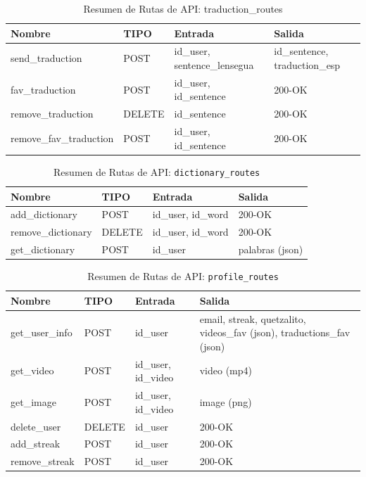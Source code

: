 \begin{table}[H]
\centering
\begin{tabularx}{\textwidth}{|l|l|l|X|}
\hline
\textbf{Nombre} & \textbf{TIPO} & \textbf{Entrada} & \textbf{Salida} \\ \hline
send\_traduction & POST & id\_user, sentence\_lensegua & id\_sentence, traduction\_esp \\ \hline
fav\_traduction & POST & id\_user, id\_sentence & 200-OK \\ \hline
remove\_traduction & DELETE & id\_sentence & 200-OK \\ \hline
remove\_fav\_traduction & POST & id\_user, id\_sentence & 200-OK \\ \hline
\end{tabularx}
\caption{Resumen de Rutas de API: traduction\_routes}
\label{tab:traduction_routes}
\end{table}

\begin{table}[H]
\centering
\begin{tabularx}{\textwidth}{|l|l|l|X|}
\hline
\textbf{Nombre} & \textbf{TIPO} & \textbf{Entrada} & \textbf{Salida} \\ \hline
add\_dictionary & POST & id\_user, id\_word & 200-OK \\ \hline
remove\_dictionary & DELETE & id\_user, id\_word & 200-OK \\ \hline
get\_dictionary & POST & id\_user & palabras (json) \\ \hline
\end{tabularx}
\caption{Resumen de Rutas de API: \texttt{dictionary\_routes}}
\label{tab:dictionary_routes}
\end{table}

\begin{table}[H]
\centering
\begin{tabularx}{\textwidth}{|l|l|l|X|}
\hline
\textbf{Nombre} & \textbf{TIPO} & \textbf{Entrada} & \textbf{Salida} \\ \hline
get\_user\_info & POST & id\_user & email, streak, quetzalito, videos\_fav (json), traductions\_fav (json) \\ \hline
get\_video & POST & id\_user, id\_video & video (mp4) \\ \hline
get\_image & POST & id\_user, id\_video & image (png) \\ \hline
delete\_user & DELETE & id\_user & 200-OK \\ \hline
add\_streak & POST & id\_user & 200-OK \\ \hline
remove\_streak & POST & id\_user & 200-OK \\ \hline
\end{tabularx}
\caption{Resumen de Rutas de API: \texttt{profile\_routes}}
\label{tab:profile_routes}
\end{table}

